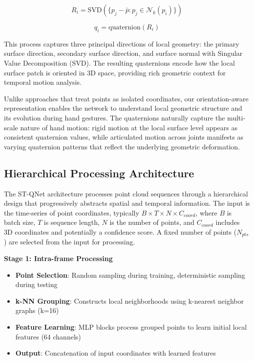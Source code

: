 \documentclass[journal]{IEEEtran}
\theoremstyle{plain}
\begin{document}
\begin{equation}
R_i = \text{SVD}(\{p_j - \bar{p} : p_j \in \mathcal{N}_k(p_i)\})
\label{eq:pca_rotation}
\end{equation}

\begin{equation}
q_i = \text{quaternion}(R_i)
\label{eq:quaternion_conversion}
\end{equation}

This process captures three principal directions of local geometry: the primary surface direction, secondary surface direction, and surface normal with Singular Value Decomposition (SVD). The resulting quaternions encode how the local surface patch is oriented in 3D space, providing rich geometric context for temporal motion analysis.

Unlike approaches that treat points as isolated coordinates, our orientation-aware representation enables the network to understand local geometric structure and its evolution during hand gestures. The quaternions naturally capture the multi-scale nature of hand motion: rigid motion at the local surface level appears as consistent quaternion values, while articulated motion across joints manifests as varying quaternion patterns that reflect the underlying geometric deformation.

\subsection{Hierarchical Processing Architecture}
The ST-QNet architecture processes point cloud sequences through a hierarchical design that progressively abstracts spatial and temporal information. The input is the time-series of point coordinates, typically \(B \times T \times N \times C_{coord}\), where \(B\) is batch size, \(T\) is sequence length, \(N\) is the number of points, and \(C_{coord}\) includes 3D coordinates and potentially a confidence score. A fixed number of points (\(N_{pts}\)) are selected from the input for processing.

\textbf{Stage 1: Intra-frame Processing}
\begin{itemize}
    \item \textbf{Point Selection}: Random sampling during training, deterministic sampling during testing
    \item \textbf{k-NN Grouping}: Constructs local neighborhoods using k-nearest neighbor graphs (k=16)
    \item \textbf{Feature Learning}: MLP blocks process grouped points to learn initial local features (64 channels)
    \item \textbf{Output}: Concatenation of input coordinates with learned features
\end{itemize}
\end{document}
